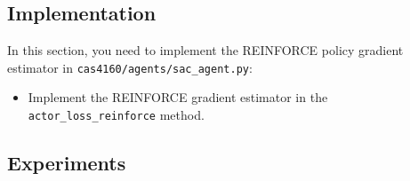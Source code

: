 \documentclass{article}
\begin{document}
\subsection{Implementation}

In this section, you need to implement the REINFORCE policy gradient estimator in \verb|cas4160/agents/sac_agent.py|:
\begin{itemize}
    \item Implement the REINFORCE gradient estimator in the \verb|actor_loss_reinforce| method.
\end{itemize}


\subsection{Experiments}
\end{document}
